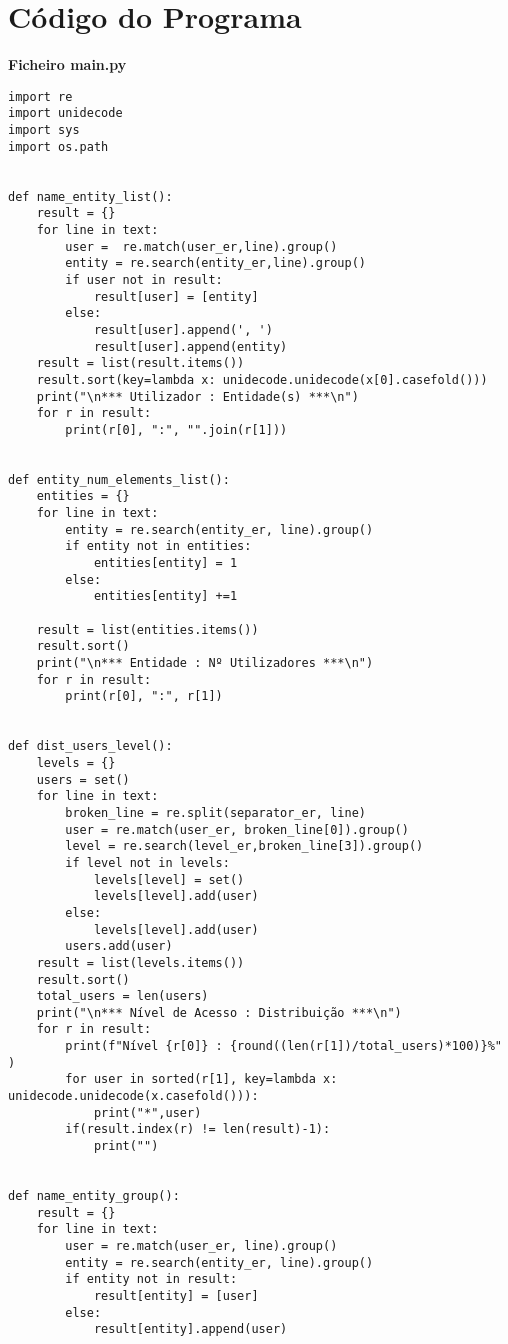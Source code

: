 \documentclass[11pt,a4paper]{report}%
\begin{document}

\appendix %
\chapter{Código do Programa}

\textbf{Ficheiro main.py}

\begin{verbatim}
import re
import unidecode
import sys
import os.path


def name_entity_list():
    result = {}
    for line in text:
        user =  re.match(user_er,line).group()
        entity = re.search(entity_er,line).group()
        if user not in result:
            result[user] = [entity]
        else:
            result[user].append(', ')
            result[user].append(entity)
    result = list(result.items())
    result.sort(key=lambda x: unidecode.unidecode(x[0].casefold()))
    print("\n*** Utilizador : Entidade(s) ***\n")
    for r in result:
        print(r[0], ":", "".join(r[1]))


def entity_num_elements_list():
    entities = {}
    for line in text:
        entity = re.search(entity_er, line).group()
        if entity not in entities:
            entities[entity] = 1
        else:
            entities[entity] +=1

    result = list(entities.items())
    result.sort()
    print("\n*** Entidade : Nº Utilizadores ***\n")
    for r in result:
        print(r[0], ":", r[1])


def dist_users_level():
    levels = {}
    users = set()
    for line in text:
        broken_line = re.split(separator_er, line)
        user = re.match(user_er, broken_line[0]).group()
        level = re.search(level_er,broken_line[3]).group()
        if level not in levels:
            levels[level] = set()
            levels[level].add(user)
        else:
            levels[level].add(user)
        users.add(user)
    result = list(levels.items())
    result.sort()
    total_users = len(users)
    print("\n*** Nível de Acesso : Distribuição ***\n")
    for r in result:
        print(f"Nível {r[0]} : {round((len(r[1])/total_users)*100)}%" )
        for user in sorted(r[1], key=lambda x: unidecode.unidecode(x.casefold())):
            print("*",user)
        if(result.index(r) != len(result)-1):
            print("")


def name_entity_group():
    result = {}
    for line in text:
        user = re.match(user_er, line).group()
        entity = re.search(entity_er, line).group()
        if entity not in result:
            result[entity] = [user]
        else:
            result[entity].append(user)


\end{verbatim}
\end{document}
